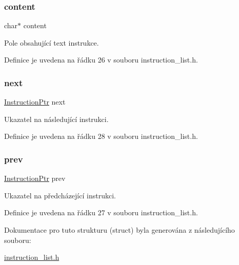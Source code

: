\subsubsection{\texorpdfstring{content}{content}}
{\footnotesize\ttfamily char$\ast$ content}



Pole obsahující text instrukce. 



Definice je uvedena na řádku 26 v souboru instruction\+\_\+list.\+h.

\mbox{\label{struct_s___instruction_a108f87dc4c7ba427715df378d065dd65}} 
\subsubsection{\texorpdfstring{next}{next}}
{\footnotesize\ttfamily \hyperlink{instruction__list_8h_aaaf9f8ee3d7203e01ba5c651c5ee8a99}{Instruction\+Ptr} next}



Ukazatel na následující instrukci. 



Definice je uvedena na řádku 28 v souboru instruction\+\_\+list.\+h.

\mbox{\label{struct_s___instruction_aa3859e312032bb77d2318dcae6e6300c}} 
\subsubsection{\texorpdfstring{prev}{prev}}
{\footnotesize\ttfamily \hyperlink{instruction__list_8h_aaaf9f8ee3d7203e01ba5c651c5ee8a99}{Instruction\+Ptr} prev}



Ukazatel na předcházející instrukci. 



Definice je uvedena na řádku 27 v souboru instruction\+\_\+list.\+h.



Dokumentace pro tuto strukturu (struct) byla generována z následujícího souboru\+:\begin{DoxyCompactItemize}
\item 
\hyperlink{instruction__list_8h}{instruction\+\_\+list.\+h}\end{DoxyCompactItemize}
